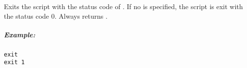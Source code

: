 \label{par:exit}

Exits the script with the status code of .
If no  is specified, the script is exit with the status code 0.
Always returns .

\subparagraph{Example:}

\begin{lstlisting}[style=Groovybash, label={lst:example_exit}]
exit
exit 1
\end{lstlisting}

